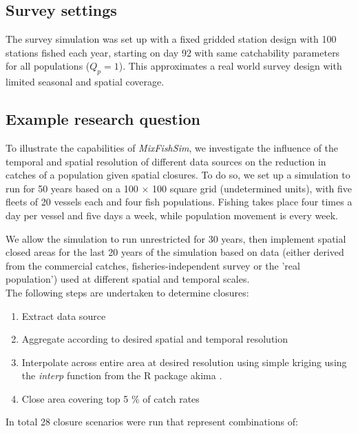 \documentclass[review]{elsarticle}
\begin{document}
\subsection{Survey settings}

The survey simulation was set up with a fixed gridded station design with 100
stations fished each year, starting on day 92  with same catchability parameters for all
populations ($Q_{p} = 1$). This approximates a real world survey design with
limited seasonal and spatial coverage. 

\subsection{Example research question}

To illustrate the capabilities of \emph{MixFishSim}, we investigate the
influence of the temporal and spatial resolution of different data sources on
the reduction in catches of a population given spatial closures. To do so, we
set up a simulation to run for 50 years based on a 100 $\times$ 100 square grid
(undetermined units), with five fleets of 20 vessels each and four fish
populations. Fishing takes place four times a day per vessel and five days a
week, while population movement is every week.

We allow the simulation to run unrestricted for 30 years,
then implement spatial closed areas for the last 20 years of the simulation
based on data (either derived from the commercial catches,
fisheries-independent survey or the 'real population') used at different
spatial and temporal scales. \\

The following steps are undertaken to determine closures:
\begin{enumerate}
	\item Extract data source
	\item Aggregate according to desired spatial and temporal resolution
	\item Interpolate across entire area at desired resolution using simple
		kriging using the \emph{interp} function from the R package
		akima \citep{Akima2006}.
	\item Close area covering top 5 \% of catch rates 
\end{enumerate}
In total 28 closure scenarios were run that represent combinations of:
\end{document}
